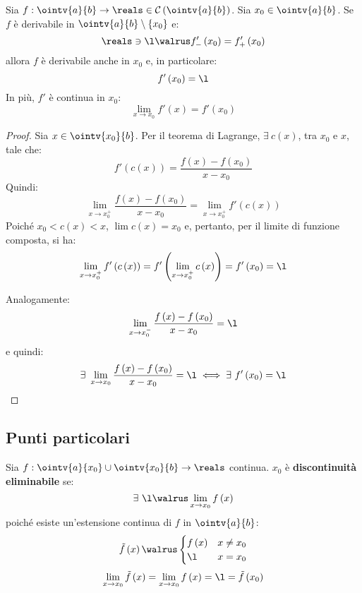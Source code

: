 \begin{theorem}
  Sia $f:\ointv{a}{b}\to\reals\in\mathcal{C}\left( \ointv{a}{b} \right)$. Sia $x_0\in\ointv{a}{b}$. Se $f$ è derivabile in $\ointv{a}{b}\setminus\left\{ x_0 \right\}$ e:
  $$\reals\ni\l\walrus f'_-\left( x_0 \right)=f'_+\left( x_0 \right)$$
  allora $f$ è derivabile anche in $x_0$ e, in particolare:
  $$f'\left( x_0 \right)=\l$$
  In più, $f'$ è continua in $x_0$:
  $$\lim_{x\to x_0}f'\left( x \right)=f'\left( x_0 \right)$$
\end{theorem}
\begin{proof}
  Sia $x\in\ointv{x_0}{b}$. Per il teorema di Lagrange, $\exists\ c\left( x \right)$, tra $x_0$ e $x$, tale che:
  $$f'\left( c\left( x \right) \right)=\frac{f\left( x \right)-f\left( x_0 \right)}{x-x_0}$$
  Quindi:
  $$\lim_{x\to x_0^+}\frac{f\left( x \right)-f\left( x_0 \right)}{x-x_0}=\lim_{x\to x_0^+}f'\left( c\left( x \right) \right)$$
  Poiché $x_0<c\left( x \right)<x$, $\lim c\left( x \right)=x_0$ e, pertanto, per il limite di funzione composta, si ha:
  $$\lim_{x\to x_0^+}f'\left( c\left( x \right) \right)=f'\left( \lim_{x\to x_0^+}c\left( x \right) \right)=f'\left( x_0 \right)=\l$$ 
  
  Analogamente:
  $$\lim_{x\to x_0^-}\frac{f\left( x \right)-f\left( x_0 \right)}{x-x_0}=\l$$
  e quindi:
  $$\exists\ \lim_{x\to x_0}\frac{f\left( x \right)-f\left( x_0 \right)}{x-x_0}=\l\iff \exists\ f'\left( x_0 \right)=\l$$
\end{proof}

\subsection{Punti particolari}

\begin{definition}
  Sia $f:\ointv{a}{x_0}\cup\ointv{x_0}{b}\to\reals$ continua. $x_0$ è \textbf{discontinuità eliminabile} se:
  $$\exists\ \l\walrus\lim_{x\to x_0}f\left( x \right)$$
  poiché esiste un'estensione continua di $f$ in $\ointv{a}{b}$:
  $$
    \tilde{f}\left( x \right)\walrus
    \begin{cases}
      f\left( x \right) & x\neq x_0 \\
      \l                & x=x_0     \\
    \end{cases}
  $$
  $$\lim_{x\to x_0}\tilde{f}\left( x \right)=\lim_{x\to x_0}f\left( x \right)=\l=\tilde{f}\left( x_0 \right)$$
\end{definition}

